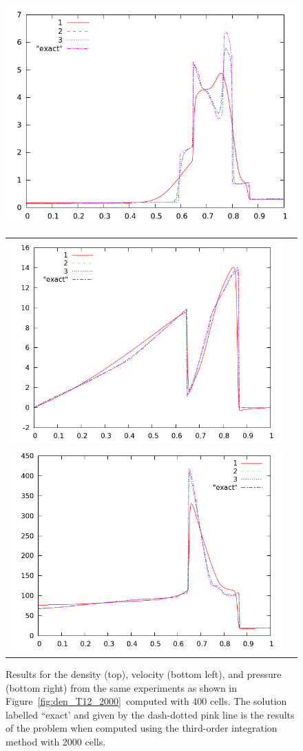 \documentclass[10pt]{article}
\begin{document}
\begin{figure}[h]
  \begin{center}
     \includegraphics[width=.95\textwidth]{den_T12_400.png}	
	\begin{tabular}{cc}
     \includegraphics[width=.475\textwidth]{vel_T12_400.png}
     \includegraphics[width=.475\textwidth]{prs_T12_400.png}	
    \end{tabular}
  \end{center}
  \caption{Results for the density (top), velocity (bottom left), and pressure (bottom right) from the same experiments as shown in Figure~\ref{fig:den_T12_2000}~computed with 400 cells. The solution labelled ``exact' and given by the dash-dotted pink line is the results of the problem when computed using the third-order integration method with 2000 cells.}
  \label{fig:den_T12_400}
\end{figure}
\end{document}
